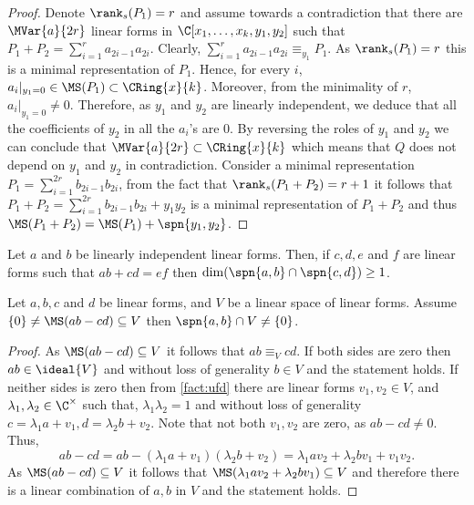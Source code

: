 \begin{proof}
Denote $\rank_s(P_1) = r$ and assume towards a contradiction that there are $\MVar{a}{2r}$ linear forms in $\C[x_1,\dots,x_k,y_1,y_2]$ such that $P_1+P_2 = \sum\limits_{i=1}^{r}a_{2i-1}a_{2i}$. 
Clearly, $\sum\limits_{i=1}^{r}a_{2i-1}a_{2i} \equiv_{y_1} P_1$. As $\rank_s(P_1) = r$  this is a minimal representation of $P_1$. Hence, for every $i$, $a_i|_{y_1=0} \in\MS(P_1)\subset \CRing{x}{k}$. Moreover, from the minimality of $r$, $a_i|_{y_1=0} \neq 0$. Therefore, as $y_1$ and $y_2$ are linearly independent, we deduce that all the coefficients of $y_2$ in all the $a_i$'s are 0. By reversing the roles of $y_1$ and $y_2$ we can conclude that $\MVar{a}{2r}\subset \CRing{x}{k}$ which  means that $Q$ does not depend on $y_1$ and $y_2$ in contradiction. Consider a minimal representation $P_1 = \sum_{i=1}^{2r} b_{2i-1}b_{2i}$,  from the fact that $\rank_s(P_1+P_2) = r+1$ it follows that  $P_1+P_2 = \sum_{i=1}^{2r} b_{2i-1}b_{2i}+y_1y_2$ is a minimal representation of $P_1+P_2$ and thus $\MS(P_1+P_2) =\MS(P_1) + \spn{y_1,y_2}$. 
\end{proof}

\begin{corollary}\label{cla:intersection}
Let $a$ and $b$ be linearly independent linear forms. Then, if $c,d,e$ and $f$ are linear forms such that $ab+cd=ef$ then $\dim(\spn{a,b}\cap \spn{c,d})\geq 1$.
\end{corollary}

\begin{claim}\label{cla:rank-2-in-V}
Let $a,b,c$ and $d$ be linear forms, and $V$ be a linear space of linear forms. Assume $\{0\} \neq \MS(ab-cd) \subseteq V$ then $\spn{a,b} \cap V\neq \{0\}$.	
\end{claim}

\begin{proof}
	As $\MS(ab-cd) \subseteq V$ it follows that $ab \equiv_{V} cd$. If both sides are zero then $ab\in \ideal{V}$ and without loss of generality $b\in V$ and the statement holds. If neither sides is zero then from \autoref{fact:ufd} there are linear forms $v_1, v_2 \in V$, and $\lambda_1, \lambda_2 \in \C^\times$ such that, $\lambda_1\lambda_2 = 1$ and without loss of generality $c = \lambda_1a + v_1, d= \lambda_2 b+v_2$. Note that not both $v_1,v_2$ are zero, as $ab-cd \neq 0$. Thus, \[ab-cd = ab - (\lambda_1 a +  v_1)(\lambda_2 b+v_2)= \lambda_1 av_2+\lambda_2 bv_1 + v_1v_2. \]
	As $\MS(ab-cd) \subseteq V$ it follows that $\MS(\lambda_1 av_2+\lambda_2 bv_1) \subseteq V$ and therefore there is a linear combination of $a,b$ in $V$ and the statement holds.
\end{proof}

